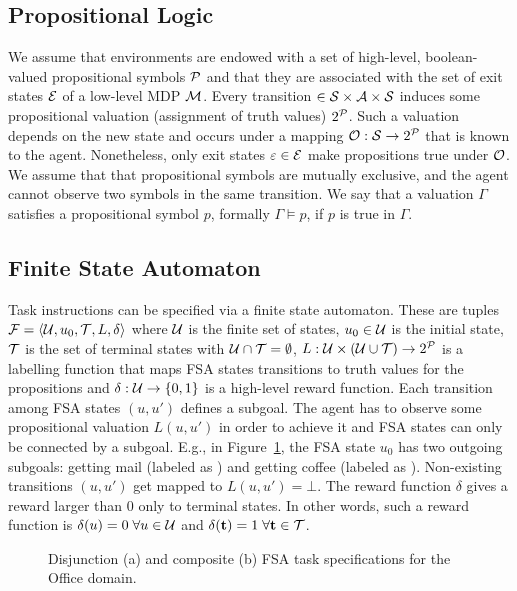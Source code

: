 \subsection{Propositional Logic}
We assume that environments are endowed with a set of high-level, boolean-valued propositional symbols $\mathcal{P}$ and that they are associated with the set of exit states $\mathcal{E}$ of a low-level MDP $\mathcal{M}$. Every transition $\in\mathcal{S}\times\mathcal{A}\times\mathcal{S}$ induces some propositional valuation (assignment of truth values) $2^{\mathcal{P}}$. Such a valuation depends on the new state and occurs under a mapping ${\mathcal{O}:\mathcal{S}\rightarrow2^{\mathcal{P}}}$ that is known to the agent. Nonetheless, only exit states $\varepsilon\in\mathcal{E}$ make propositions true under $\mathcal{O}$. We assume that that propositional symbols are mutually exclusive, and the agent cannot observe two symbols in the same transition. We say that a valuation $\Gamma$ satisfies a propositional symbol $p$, formally $\Gamma\vDash p$, if $p$ is true in $\Gamma$. 

\subsection{Finite State Automaton} Task instructions can be specified via a finite state automaton. These are tuples ${\mathcal{F}=\langle \mathcal{U},u_0,\mathcal{T},L,\delta\rangle}$ where $\mathcal{U}$ is the finite set of states, $u_0\in\mathcal{U}$ is the initial state, $\mathcal{T}$ is the set of terminal states with $\mathcal{U}\cap\mathcal{T}=\emptyset$, $L:\mathcal{U}\times(\mathcal{U}\cup\mathcal{T})\rightarrow 2^{\mathcal{P}}$ is a labelling function that maps FSA states transitions to truth values for the propositions and $\delta:\mathcal{U}\rightarrow \{0, 1\}$ is a high-level reward function. Each transition among FSA states $(u, u')$ defines a subgoal. The agent has to observe some propositional valuation $L(u, u')$ in order to achieve it and FSA states can only be connected by a subgoal. E.g., in Figure~\ref{fig:office_fsa_disjunction}, the FSA state $u_0$ has two outgoing subgoals: getting mail (labeled as \mail) and getting coffee (labeled as \coffee). Non-existing transitions $(u, u')$ get mapped to $L(u, u')=\bot$. The reward function $\delta$ gives a reward larger than 0 only to terminal states. In other words, such a reward function is $\delta(u)=0\;\forall u\in\mathcal{U}$ and $\delta(\mathbf{t})=1\;\forall \mathbf{t}\in\mathcal{T}$. 

\begin{figure}[!hbt]
  \centering
  \begin{subfigure}[h]{0.23\textwidth}
    \centering
    
    \caption{}
    \label{fig:office_fsa_disjunction}
  \end{subfigure}
  \hfill 
  \begin{subfigure}[h]{0.23\textwidth}
    \centering
    
    \caption{}
    \label{fig:office_fsa_composite}
  \end{subfigure}
  \caption{Disjunction (a) and composite (b) FSA task specifications for the Office domain.}
 \label{fig:sample_fsas}
\end{figure} 

